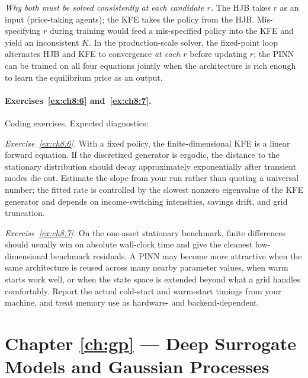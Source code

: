 \documentclass[11pt,a4paper]{report}
\begin{document}
\emph{Why both must be solved consistently at each candidate $r$.}  The HJB takes $r$ as an input (price-taking agents); the KFE takes the policy from the HJB.  Mis-specifying $r$ during training would feed a mis-specified policy into the KFE and yield an inconsistent $K$.  In the production-scale solver, the fixed-point loop alternates HJB and KFE to convergence \emph{at each $r$} before updating $r$; the PINN can be trained on all four equations jointly when the architecture is rich enough to learn the equilibrium price as an output.

\paragraph{Exercises~\ref{ex:ch8:6} and~\ref{ex:ch8:7}.}
Coding exercises.  Expected diagnostics:

\emph{Exercise~\ref{ex:ch8:6}.}  With a fixed policy, the finite-dimensional KFE is a linear forward equation.  If the discretized generator is ergodic, the distance to the stationary distribution should decay approximately exponentially after transient modes die out.  Estimate the slope from your run rather than quoting a universal number; the fitted rate is controlled by the slowest nonzero eigenvalue of the KFE generator and depends on income-switching intensities, savings drift, and grid truncation.

\emph{Exercise~\ref{ex:ch8:7}.}  On the one-asset stationary benchmark, finite differences should usually win on absolute wall-clock time and give the cleanest low-dimensional benchmark residuals.  A PINN may become more attractive when the same architecture is reused across many nearby parameter values, when warm starts work well, or when the state space is extended beyond what a grid handles comfortably.  Report the actual cold-start and warm-start timings from your machine, and treat memory use as hardware- and backend-dependent.

\section{Chapter \ref{ch:gp} --- Deep Surrogate Models and Gaussian Processes}
\label{sol:ch9}
\end{document}
